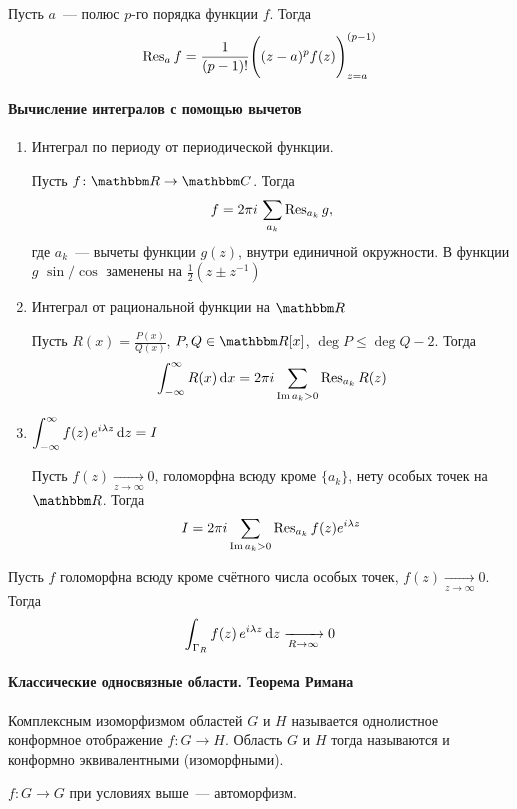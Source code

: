 \documentclass[12pt,timbord]{../../../notes}
\begin{document}
\begin{thrm}\label{thrm:tfcv::resuduepole::pirt}
  Пусть $a$~--- полюс $p$-го порядка функции $f$. Тогда
  \[
    \operatorname{Res}_a f =  \frac{1}{(p-1)!} \Biggl((z-a)^p f(z)\Biggr)^{(p-1)}_{z=a}
  \]
\end{thrm}

\paragraph{Вычисление интегралов с помощью вычетов}
\label{par:tfcv::intresidue}

\begin{enumerate}[I$\rangle$]
  \item Интеграл по периоду от периодической функции. \par
    Пусть $f\colon \R \to \C$. Тогда
    \[
      f = 2\pi i \, \sum_{a_k} \operatorname{Res}_{a_k} g,
    \]
    где $a_k$~--- вычеты функции $g(z)$, внутри единичной окружности. В функции $g$ $\sin/\cos$
    заменены на $\frac{1}{2} \left(z \pm z^{-1}\right)$ 
  \item Интеграл от рациональной функции на $\R$ \par
    Пусть $R(x) = \frac{P(x)}{Q(x)}$, $P, Q \in \R[x]$, $\deg P \leqslant \deg Q-2 $.  Тогда 
    \[
      \int_{-\infty}^{\infty} R(x) \,\mathrm{d} x= 2 \pi i \sum_{\operatorname{Im} a_k > 0} \operatorname{Res}_{a_k} R(z)
    \]
  \item $\displaystyle \int_{-\infty}^{\infty} f(z) \, e^{i \lambda z} \, \mathrm{d} z = I$ \par
  Пусть $f(z) \xrightarrow[z\to \infty]{}  0$, голоморфна всюду кроме $\{a_k\}$, нету особых точек
  на $\R$. Тогда
  \[
    I = 2 \pi i \sum_{\operatorname{Im} a_k > 0} \operatorname{Res}_{a_k} f(z) e^{i\lambda z}
  \]
\end{enumerate}

\begin{lem}[Жордана]\label{lem:tfcv::intresidue::jordan}
  Пусть $f$ голоморфна всюду кроме счётного числа особых точек, $f(z) \xrightarrow[z\to \infty]{}  0$.
  Тогда
  \[
    \int_{\Gamma_R} f(z) \, e^{i \lambda z} \, \mathrm{d} z \xrightarrow[R \to \infty]{} 0
  \]
\end{lem}

\setcounter{paragraph}{54}
\paragraph{Классические односвязные области. Теорема Римана}
\label{par:tfcv::riemanaut}

\begin{defn}\label{defn:tfcv::riemanaut::isom}
  Комплексным изоморфизмом областей $G$ и $H$ называется однолистное конформное отображение
  $f \colon G \to H$. Область $G$ и $H$ тогда называются и конформно эквивалентными (изоморфными).
\end{defn}
\begin{rem*}
  $f\colon G \to G$ при условиях выше~--- автоморфизм.
\end{rem*}
\end{document}

